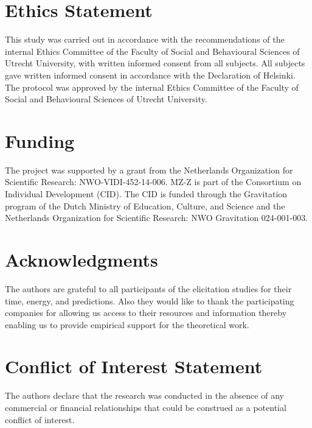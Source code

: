 \documentclass[openright,titlepage,12pt,a4paper]{book}
\begin{document}
\hypertarget{ch02ethics}{%
\section*{Ethics Statement}\label{ch02ethics}}

This study was carried out in accordance with the recommendations of the internal Ethics Committee of the Faculty of Social and Behavioural Sciences of Utrecht University, with written informed consent from all subjects. All subjects gave written informed consent in accordance with the Declaration of Helsinki. The protocol was approved by the internal Ethics Committee of the Faculty of Social and Behavioural Sciences of Utrecht University.

\hypertarget{ch02funding}{%
\section*{Funding}\label{ch02funding}}

The project was supported by a grant from the Netherlands Organization for Scientific Research: NWO-VIDI-452-14-006. MZ-Z is part of the Consortium on Individual Development (CID). The CID is funded through the Gravitation program of the Dutch Ministry of Education, Culture, and Science and the Netherlands Organization for Scientific Research: NWO Gravitation 024-001-003.

\hypertarget{ch02acknowledgments}{%
\section*{Acknowledgments}\label{ch02acknowledgments}}

The authors are grateful to all participants of the elicitation studies for their time, energy, and predictions. Also they would like to thank the participating companies for allowing us access to their resources and information thereby enabling us to provide empirical support for the theoretical work.

\hypertarget{ch02conflict}{%
\section*{Conflict of Interest Statement}\label{ch02conflict}}

The authors declare that the research was conducted in the absence of any commercial or financial relationships that could be construed as a potential conflict of interest.
\end{document}

